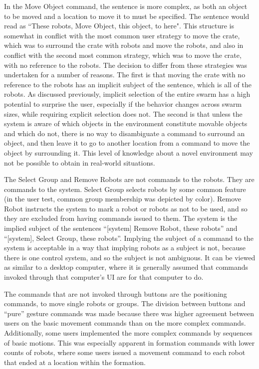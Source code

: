 In the Move Object command, the sentence is more complex, as both an object to be moved and a location to move it to must be specified. 
The sentence would read as ``These robots, Move Object, this object, to here". 
This structure is somewhat in conflict with the most common user strategy to move the crate, which was to surround the crate with robots and move the robots, and also in conflict with the second most common strategy, which was to move the crate, with no reference to the robots. 
The decision to differ from these strategies was undertaken for a number of reasons. 
The first is that moving the crate with no reference to the robots has an implicit subject of the sentence, which is all of the robots. 
As discussed previously, implicit selection of the entire swarm has a high potential to surprise the user, especially if the behavior changes across swarm sizes, while requiring explicit selection does not. 
The second is that unless the system is aware of which objects in the environment constitute movable objects and which do not, there is no way to disambiguate a command to surround an object, and then leave it to go to another location from a command to move the object by surrounding it.
This level of knowledge about a novel environment may not be possible to obtain in real-world situations. 

The Select Group and Remove Robots are not commands to the robots. 
They are commands to the system. 
Select Group selects robots by some common feature (in the user test, common group membership was depicted by color). 
Remove Robot instructs the system to mark a robot or robots as not to be used, and so they are excluded from having commands issued to them. 
The system is the implied subject of the sentences ``[system] Remove Robot, these robots'' and ``[system], Select Group, these robots''. 
Implying the subject of a command to the system is acceptable in a way that implying robots as a subject is not, because there is one control system, and so the subject is not ambiguous. 
It can be viewed as similar to a desktop computer, where it is generally assumed that commands invoked through that computer's UI are for that computer to do. 

The commands that are not invoked through buttons are the positioning commands, to move single robots or groups. 
The division between buttons and ``pure'' gesture commands was made because there was higher agreement between users on the basic movement commands than on the more complex commands. 
Additionally, some users implemented the more complex commands by sequences of basic motions. 
This was especially apparent in formation commands with lower counts of robots, where some users issued a movement command to each robot that ended at a location within the formation. 

